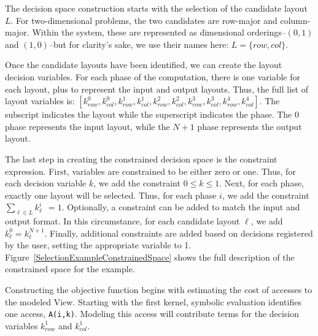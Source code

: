 The decision space construction starts with the selection of the candidate layout $L$.
For two-dimensional problems, the two candidates are row-major and column-major.
Within the system, these are represented as dimensional orderings--$(0,1)$ and $(1,0)$--but for clarity's sake, we use their names here: $L=\{row,col\}$.

Once the candidate layouts have been identified, we can create the layout decision variables.
For each phase of the computation, there is one variable for each layout, plus to represent the input and output layouts.
Thus, the full list of layout variables is: $[k_{row}^{0}, k_{col}^{0}, k_{row}^{1}, k_{col}^{1},k_{row}^{2}, k_{col}^{2},k_{row}^{3}, k_{col}^{3},k_{row}^{4}, k_{col}^{4}]$.
The subscript indicates the layout while the superscript indicates the phase. 
The 0 phase represents the input layout, while the $N+1$ phase represents the output layout.

The last step in creating the constrained decision space is the constraint expression. 
First, variables are constrained to be either zero or one. 
Thus, for each decision variable $k$, we add the constraint $0 \leq k \leq 1$.
Next, for each phase, exactly one layout will be selected. 
Thus, for each phase $i$, we add the constraint $\sum_{\ell \in L} k_\ell^{i} \ \ = 1$.
Optionally, a constraint can be added to match the input and output format.
In this circumstance, for each candidate layout $\ell$, we add $k_\ell^{0} = k_\ell^{N+1}$.
Finally, additional constraints are added based on decisions registered by the user, setting the appropriate variable to 1.
Figure~\ref{SelectionExampleConstrainedSpace} shows the full description of the constrained space for the example.


Constructing the objective function begins with estimating the cost of accesses to the modeled View.
Starting with the first kernel, symbolic evaluation identifies one access, \verb.A(i,k)..
Modeling this access will contribute terms for the decision variables $k_{row}^1$ and $k_{col}^1$.

